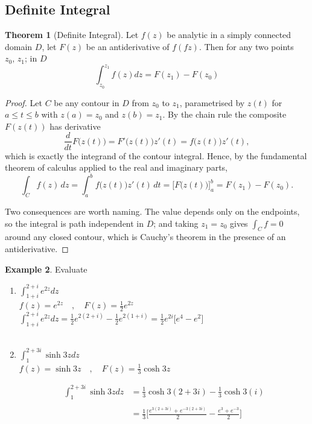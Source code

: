 \documentclass[11pt,a4paper]{article}
\theoremstyle{definition}
\newtheorem{thm}{Theorem}[section]
\newtheorem{example}[thm]{Example}
\begin{document}
\pagebreak

{\color[wave]{485}\subsection{Definite Integral}}

\begin{thm}[Definite Integral]
Let $f(z)$ be analytic in a simply connected domain $D$, let $F(z)$ be an antiderivative of $f(fz)$. Then for any two points $z_0, \, z_1$; in $D$ $$\int_{z_0}^{z_1} f(z)dz = F(z_1) - F(z_0)$$
\end{thm}

\begin{proof}
Let $C$ be any contour in $D$ from $z_0$ to $z_1$, parametrised by $z(t)$ for
$a\leq t\leq b$ with $z(a)=z_0$ and $z(b)=z_1$. By the chain rule the composite
$F(z(t))$ has derivative
$$\frac{d}{dt}F\big(z(t)\big)=F'\big(z(t)\big)z'(t)=f\big(z(t)\big)z'(t),$$
which is exactly the integrand of the contour integral. Hence, by the
fundamental theorem of calculus applied to the real and imaginary parts,
$$\int_C f(z)\,dz=\int_a^b f\big(z(t)\big)z'(t)\,dt
=\Big[F\big(z(t)\big)\Big]_a^b=F(z_1)-F(z_0).$$

Two consequences are worth naming. The value depends only on the endpoints, so
the integral is path independent in $D$; and taking $z_1=z_0$ gives
$\int_C f=0$ around any closed contour, which is Cauchy's theorem in the
presence of an antiderivative.
\end{proof}

\begin{example}
Evaluate\\


\begin{enumerate}
\item $\displaystyle{\int_{1 + i}^{2 + i} e^{2z}dz}$\\

$f(z) = e^{2z}\quad , \quad  F(z) = \frac{1}{2}e^{2z}$\\

$\displaystyle{\int_{1 + i}^{2 + i} e^{2z}dz  = \frac{1}{2}e^{2(2+i)} - \frac{1}{2}e^{2(1 + i)} = \frac{1}{2}e^{2i}\Big[ e^4 - e^2\Big]}$\\\\



\item $\displaystyle{\int_1^{2 + 3i} \sinh 3z dz}$\\

$f(z) = \sinh 3z\quad , \quad  F(z) = \frac{1}{3}\cosh 3z$

\begin{align*}
\int_1^{2 + 3i} \sinh 3z dz & = \frac{1}{3}\cosh 3(2  + 3i) - \frac{1}{3}\cosh 3(i)\\\\
& = \frac{1}{3}\Bigg[\frac{e^{3(2 + 3i)} + e^{-3(2 + 3i)}}{2}  - \frac{e^3 + e^{-3}}{2}\Bigg]\\\\
\end{align*}
\end{enumerate}
\end{example}
\end{document}
